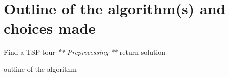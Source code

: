 \documentclass[a4paper]{article}
\begin{document}
%
%
%
%
%
%
%
%
%
%
%
%
%
%
%
%
%
%
%
%

\section{Outline of the algorithm(s) and choices made}
\begin{algorithm}
	Find a TSP tour\;
	\textit{** Preprocessing **}\;
  return solution\;
 \caption{outline of the algorithm}
\end{algorithm}
\end{document}
